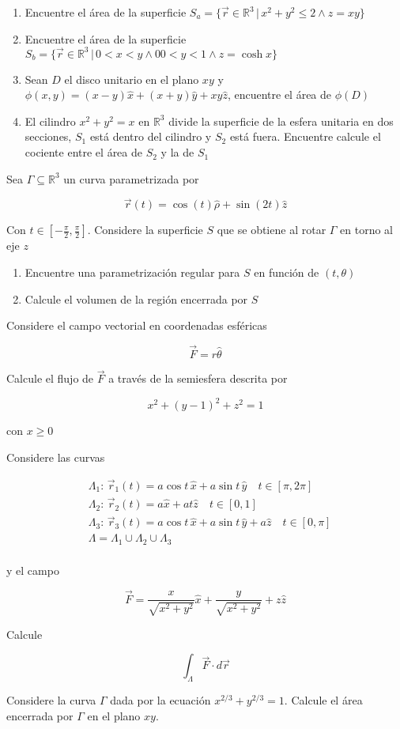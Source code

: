 \begin{enumerate}[label=\alph*)]
    \item Encuentre el área de la superficie $S_a = \{\Vec{r}\in\mathbb{R}^3\,|\,x^2+y^2\leq 2\wedge z=xy\}$
    \item Encuentre el área de la superficie $S_b = \{\Vec{r}\in\mathbb{R}^3\,|\,0<x<y\wedge 00<y<1\wedge z=\cosh{x}\}$
    \item Sean $D$ el disco unitario en el plano $xy$ y $\phi(x,y)=(x-y)\hat{x}+(x+y)\hat{y}+xy\hat{z}$, encuentre el área de $\phi(D)$
    \item El cilindro $x^2+y^2=x$ en $\mathbb{R}^3$ divide la superficie de la esfera unitaria en dos secciones, $S_1$ está dentro del cilindro y $S_2$ está fuera. Encuentre calcule el cociente entre el área de $S_2$ y la de $S_1$
\end{enumerate}
\bigbreak
\np

Sea $\Gamma\subseteq\mathbb{R}^3$ un curva parametrizada por

\[\Vec{r}(t) = \cos{(t)}\hat{\rho}+\sin{(2t)}\hat{z}\]

Con $t\in [-\frac{\pi}{2},\frac{\pi}{2}]$. Considere la superficie $S$ que se obtiene al rotar $\Gamma$ en torno al eje $z$

\begin{enumerate}[label=\alph*)]
    \item Encuentre una parametrización regular para $S$ en función de $(t, \theta)$
    \item Calcule el volumen de la región encerrada por $S$
\end{enumerate}
\bigbreak
\np

Considere el campo vectorial en coordenadas esféricas

\[\Vec{F} = r\hat{\theta}\]

Calcule el flujo de $\Vec{F}$ a través de la semiesfera descrita por

\[x^2+(y-1)^2+z^2=1\]

con $x\geq 0$
\bigbreak
\np

Considere las curvas

\begin{equation}
\begin{split}
    &\Lambda_1:\,\Vec{r}_1(t)=a\cos{t}\,\hat{x}+a\sin{t}\,\hat{y}\quad t\in [\pi,2\pi]\\
    &\Lambda_2:\,\Vec{r}_2(t)=a\hat{x}+at\hat{z}\quad t\in [0,1]\\
    &\Lambda_3:\,\Vec{r}_3(t)=a\cos{t}\,\hat{x}+a\sin{t}\,\hat{y}+a\hat{z}\quad t\in [0,\pi]\\
    &\Lambda=\Lambda_1\cup\Lambda_2\cup\Lambda_3\\
\end{split}
\nonumber
\end{equation}

y el campo

\[\Vec{F}=\frac{x}{\sqrt{x^2+y^2}}\hat{x}+\frac{y}{\sqrt{x^2+y^2}}+z\hat{z}\]

Calcule

\[\int_\Lambda\Vec{F}\cdot d\Vec{r}\]
\bigbreak

\np

Considere la curva $\Gamma$ dada por la ecuación $x^{2/3}+y^{2/3}=1$. Calcule el área encerrada por $\Gamma$ en el plano $xy$.

\newpage